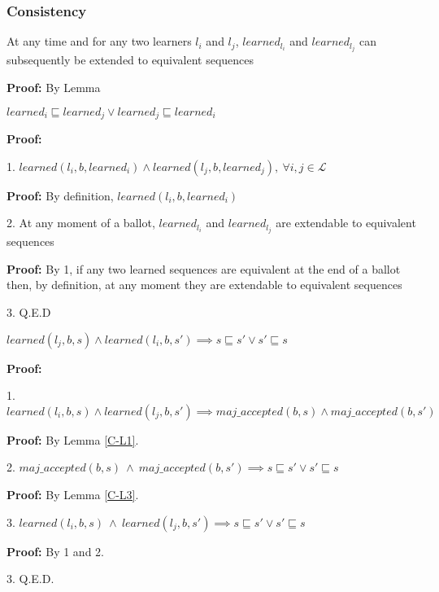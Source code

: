 \subsubsection{Consistency}
\begin{theorem}At any time and for any two learners $l_i$ and $l_j$, $learned_{l_i}$ and $learned_{l_j}$ can subsequently be extended to equivalent sequences
\end{theorem} 
\textbf{Proof:} By Lemma 
\begin{lemma}
$learned_i \sqsubseteq learned_j \lor learned_j \sqsubseteq  learned_i$ \label{C-L} \par
\end{lemma}
\textbf{Proof:} \par
1. $learned(l_i,b,learned_i) \land learned(l_j,b,learned_j),\ \forall i,j \in \mathcal{L}$ \par
\indent\indent\textbf{Proof:} By definition, $learned(l_i,b,learned_i)$ \par
2. At any moment of a ballot, $learned_{l_i}$ and $learned_{l_j}$ are extendable to equivalent sequences \par
\indent\indent\textbf{Proof:} By 1, if any two learned sequences are equivalent at the end of a ballot then, by definition, at any moment they are extendable to equivalent sequences\par
3. Q.E.D \par

\begin{lemma}
$learned(l_j,b,s) \land learned(l_i,b,s') \implies s \sqsubseteq s' \lor s' \sqsubseteq s$ \par
\end{lemma}
\textbf{Proof:} \par
1. $learned(l_i,b,s) \land learned(l_j,b,s') \implies maj\_accepted(b,s) \land maj\_accepted(b,s')$ \par
\indent\indent\textbf{Proof:} By Lemma \ref{C-L1}.\par
2. $maj\_accepted(b,s)\ \land\ maj\_accepted(b,s') \implies s \sqsubseteq s' \lor s' \sqsubseteq s$ \par
\indent\indent\textbf{Proof:} By Lemma \ref{C-L3}.\par
3. $learned(l_i,b,s)\ \land\ learned(l_j,b,s') \implies s \sqsubseteq s' \lor s' \sqsubseteq s$ \par
\indent\indent\textbf{Proof:} By 1 and 2.\par
3. Q.E.D. \par

